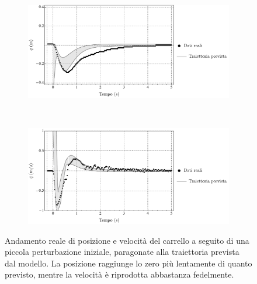 \begin{figure}
    \centering
    \begin{subfigure}[]{\textwidth}
        \centering
        \includegraphics[width=\textwidth]{assets/x-plot}
    \end{subfigure}
    \\[5ex]
    \begin{subfigure}[]{\textwidth}
        \centering
        \includegraphics[width=\textwidth]{assets/v-plot}
    \end{subfigure}

    \caption[Resistenza alle perturbazioni: posizione e velocità]{
        Andamento reale di posizione e velocità del carrello
        a seguito di una piccola perturbazione iniziale,
        paragonate alla traiettoria prevista dal modello.
        La posizione raggiunge lo zero più lentamente di quanto previsto,
        mentre la velocità è riprodotta abbastanza fedelmente.
    }
    \label{fig:swag1}
\end{figure}


